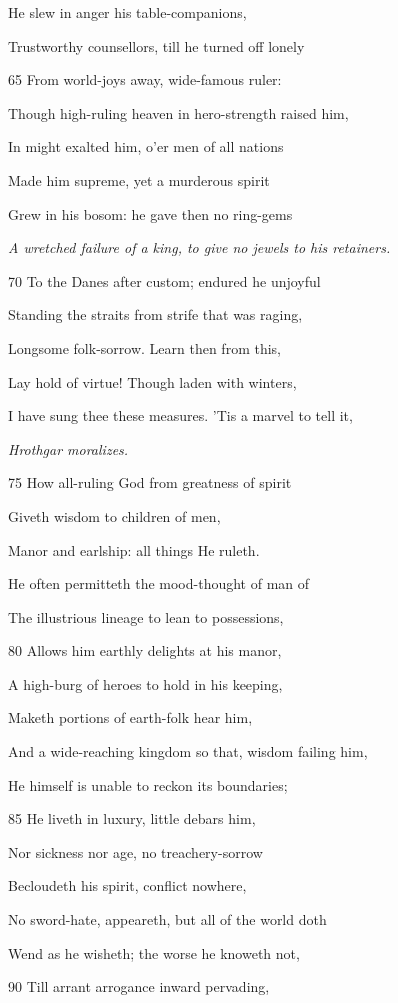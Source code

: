 He slew in anger his table-companions,

Trustworthy counsellors, till he turned off lonely

65
From world-joys away, wide-famous ruler:

Though high-ruling heaven in hero-strength raised him,

In might exalted him, o’er men of all nations

Made him supreme, yet a murderous spirit

Grew in his bosom: he gave then no ring-gems

\emph{A wretched failure
of a king, to give
no jewels to his
retainers.}

70
To the Danes after custom; endured he unjoyful

Standing the straits from strife that was raging,

Longsome folk-sorrow. Learn then from this,

Lay hold of virtue! Though laden with winters,

I have sung thee these measures. ’Tis a marvel to tell it,

\emph{Hrothgar moralizes.}

75
How all-ruling God from greatness of spirit

Giveth wisdom to children of men,

Manor and earlship: all things He ruleth.

He often permitteth the mood-thought of man of

The illustrious lineage to lean to possessions,

80
Allows him earthly delights at his manor,

A high-burg of heroes to hold in his keeping,

Maketh portions of earth-folk hear him,

And a wide-reaching kingdom so that, wisdom failing him,

He himself is unable to reckon its boundaries;

85
He liveth in luxury, little debars him,

Nor sickness nor age, no treachery-sorrow

Becloudeth his spirit, conflict nowhere,

No sword-hate, appeareth, but all of the world doth

Wend as he wisheth; the worse he knoweth not,

90
Till arrant arrogance inward pervading,

